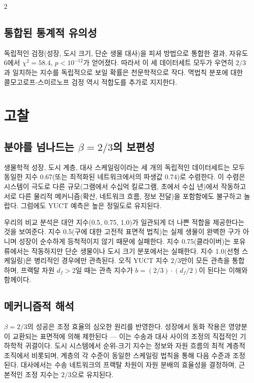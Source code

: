 \documentclass[11pt,a4paper]{article}
\newcommand{\df}{d_f}
\begin{document}
\begin{multicols}{2}
		\subsection{통합된 통계적 유의성}
		
		독립적인 검정(성장, 도시 크기, 단순 생물 대사)을 피셔 방법으로 통합한 결과, 자유도 6에서 \(\chi^2 = 58.4\), \(p < 10^{-12}\)가 얻어졌다. 따라서 이 세 데이터세트 모두가 우연히 \(2/3\)과 일치하는 지수를 독립적으로 보일 확률은 천문학적으로 작다. 멱법칙 분포에 대한 콜모고로프-스미르노프 검정 역시 적합도를 추가로 지지한다.
		
		\section{고찰}
		
		\subsection{분야를 넘나드는 \(\beta = 2/3\)의 보편성}
		
		생물학적 성장, 도시 계층, 대사 스케일링이라는 세 개의 독립적인 데이터세트는 모두 동일한 지수 \(0.67\)(또는 최적화된 네트워크에서의 파생값 \(0.74\))로 수렴한다. 이 수렴은 시스템이 극도로 다른 규모(그램에서 수십억 킬로그램, 초에서 수십 년)에서 작동하고 서로 다른 물리적 메커니즘(확산, 네트워크 흐름, 정보 전달)을 포함함에도 불구하고 놀랍다. 그럼에도 YUCT 예측은 높은 정밀도로 유지된다.
		
		우리의 비교 분석은 대안 지수(0.5, 0.75, 1.0)가 일관되게 더 나쁜 적합을 제공한다는 것을 보여준다. 지수 0.5(구에 대한 고전적 표면적 법칙)는 실제 생물이 완벽한 구가 아니며 성장이 순수하게 등척적이지 않기 때문에 실패한다. 지수 0.75(클라이버)는 포유류에서는 작동하지만 단순 생물이나 도시 크기 분포에서는 실패한다. 지수 1.0(선형 스케일링)은 병리적인 경우에만 관측된다. 오직 YUCT 지수 \(2/3\)만이 모든 관측을 통합하며, 프랙탈 차원 \(\df > 2\)일 때는 관측 지수가 \(b = (2/3) \cdot (\df/2)\)이 된다는 이해와 함께이다.
		
		\subsection{메커니즘적 해석}
		
		\(\beta = 2/3\)의 성공은 조정 효율의 심오한 원리를 반영한다. 성장에서 동화 작용은 영양분이 교환되는 표면적에 의해 제한된다 — 이는 수송과 대사 사이의 조정의 직접적인 기하학적 귀결이다. 도시 시스템에서 순위-크기 지수는 정보와 자원 흐름의 최적 계층적 조직에서 비롯되며, 계층의 각 수준이 동일한 스케일링 법칙을 통해 다음 수준과 조정된다. 대사에서는 수송 네트워크의 프랙탈 차원이 자원 분배의 효율성을 결정하며, 근본적인 조정 지수는 \(2/3\)으로 유지된다.
		

\end{multicols}
\end{document}
